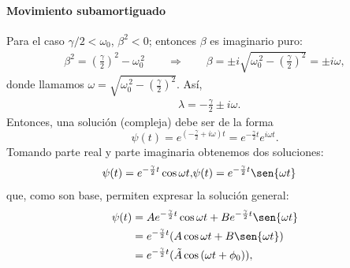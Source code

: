 \documentclass[a4paper,spanish]{article}
\numberwithin{equation}{section}
\begin{document}
 

\paragraph{Movimiento subamortiguado}

Para el caso $\gamma/2<\omega_0$, $\beta^2<0$; entonces $\beta$ es imaginario puro:
		\begin{align*}
			\beta^2 =\left(\frac{\gamma}{2}\right)^2-\omega_0^{\,2}
			\qquad \Rightarrow \qquad
			\beta   =\pm i \sqrt{\omega_0^{\,2} - \left(\frac{\gamma}{2}\right)^2} = \pm i\omega,
		\end{align*}
donde llamamos $\omega = \sqrt{\omega_0^{\,2} - \left(\frac{\gamma}{2}\right)^2}$. Así,
		\begin{align*}
			&\lambda = -\frac{\gamma}{2} \pm i \omega.
		\end{align*}
Entonces, una soluci\'on (compleja) debe ser de la forma
		\begin{equation}
			\psi(t) = e^{(-\frac{\gamma}{2} + i \omega)t} = e^{-\frac{\gamma}{2}t} e^{i\omega t}.
                        \label{eq:oscilador_amortiguado_subamortiguado}
		\end{equation}
Tomando parte real y parte imaginaria obtenemos dos soluciones:
		\begin{align*}
			\psi(t) = e^{-\frac{\gamma}{2}t}\cos{\omega t}, &\psi(t)	= e^{-\frac{\gamma}{2}t}\sen{\omega t}
		\end{align*}
que, como son base, permiten expresar la soluci\'on general:
		\begin{align*}
			\psi(t) &= Ae^{-\frac{\gamma}{2}t}\cos{\omega t} + Be^{-\frac{\gamma}{2}t}\sen{\omega t}\\
				&= e^{-\frac{\gamma}{2}t} (A \cos{\omega t} + B \sen{\omega t})\\
				&= e^{-\frac{\gamma}{2}t} (\tilde{A} \cos{(\omega t + \phi_0)}),
		\end{align*}
\end{document}
